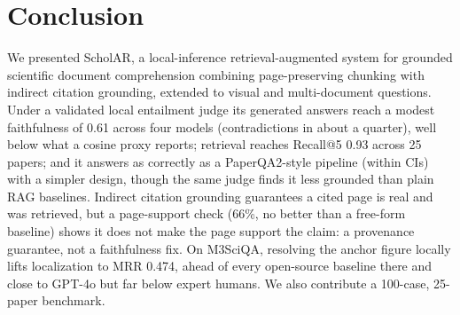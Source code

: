 \documentclass[letterpaper]{article} %
\begin{document}
\section{Conclusion}
We presented ScholAR, a local-inference retrieval-augmented system for grounded scientific
document comprehension combining page-preserving chunking with indirect citation grounding,
extended to visual and multi-document questions. Under a validated local entailment judge its
generated answers reach a modest faithfulness of 0.61 across four models (contradictions in about a
quarter), well below what a cosine proxy reports; retrieval reaches Recall@5 0.93 across 25 papers;
and it answers as correctly as a PaperQA2-style pipeline (within CIs) with a simpler design, though
the same judge finds it less grounded than plain RAG baselines. Indirect citation grounding guarantees a cited page is real and was retrieved, but a
page-support check (66\%, no better than a free-form baseline) shows it does not make the page
support the claim: a provenance guarantee, not a faithfulness fix. On M3SciQA, resolving the anchor
figure locally lifts localization to MRR 0.474, ahead of every open-source baseline there and close
to GPT-4o but far below expert humans. We also contribute a 100-case, 25-paper benchmark.


\end{document}
